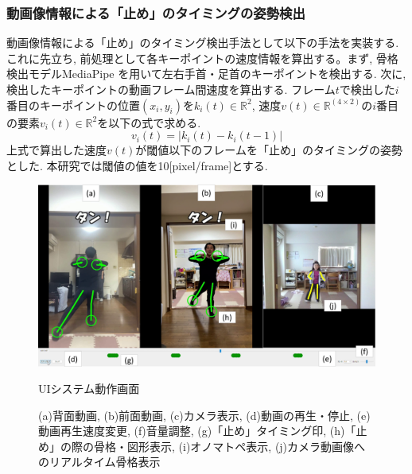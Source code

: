 \documentclass[paper]{ieicej}
\begin{document}
\subsubsection{動画像情報による「止め」のタイミングの姿勢検出}
動画像情報による「止め」のタイミング検出手法として以下の手法を実装する. これに先立ち, 前処理として各キーポイントの速度情報を算出する。まず, 骨格検出モデルMediaPipe \cite{ref24}を用いて左右手首・足首のキーポイントを検出する. 次に, 検出したキーポイントの動画フレーム間速度を算出する. フレーム$t$で検出した$i$番目のキーポイントの位置$(x_{i},y_{i})$を$k_{i}(t)\in\mathbb{R}^2$, 速度$v(t)\in\mathbb{R}^{(4 \times 2)}$の$i$番目の要素$v_{i}(t)\in\mathbb{R}^2$を以下の式で求める. 
\begin{equation}
  v_{i} (t)=|k_{i}(t)-k_{i}(t-1)|
\end{equation}
上式で算出した速度$v(t)$が閾値以下のフレームを「止め」のタイミングの姿勢とした. 本研究では閾値の値を10[pixel/frame]とする. 
\begin{figure}[t]
  \centering
  \includegraphics[width=\linewidth]{./images/UI_system_ui2.png}
  \caption{UIシステム動作画面}
  \caption*{\footnotesize (a)背面動画, (b)前面動画, (c)カメラ表示, 
             (d)動画の再生・停止, (e)動画再生速度変更, (f)音量調整, 
             (g)「止め」タイミング印, (h)「止め」の際の骨格・図形表示, 
             (i)オノマトペ表示, (j)カメラ動画像へのリアルタイム骨格表示}
  \vspace{-2.0ex} %
\end{figure}
\end{document}
